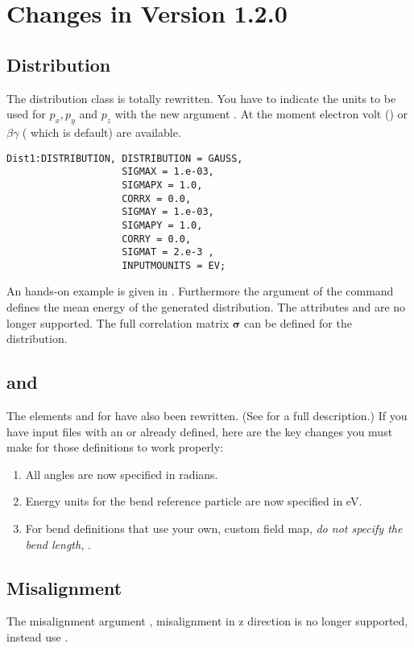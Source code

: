 \section{Changes in \opal Version 1.2.0}
\subsection{Distribution}
The distribution class is totally rewritten. You have to indicate the units to be used for $p_x,p_y$ and $p_z$ with the
new argument . At the moment electron volt () or $\beta\gamma$ ( which is default) are available.
\begin{Verbatim}[label={My orange command sample output}]
Dist1:DISTRIBUTION, DISTRIBUTION = GAUSS,
                    SIGMAX = 1.e-03,
                    SIGMAPX = 1.0,
                    CORRX = 0.0,
                    SIGMAY = 1.e-03,
                    SIGMAPY = 1.0,
                    CORRY = 0.0,
                    SIGMAT = 2.e-3 ,
                    INPUTMOUNITS = EV;
\end{Verbatim}
An hands-on example is given in . Furthermore the  argument of the  command defines the mean energy of the generated distribution. The attributes  and  are no longer supported. The full
correlation matrix $\mathbf\sigma$ can be defined for the  distribution.

\subsection{ and }
The elements  and  for \opalt have also been rewritten. (See  for a
full description.) If you have input files with an  or  already defined, here are the key
changes you must make for those definitions to work properly:

\begin{enumerate}
\item All angles are now specified in radians.
\item Energy units for the bend reference particle are now specified in eV.
\item For bend definitions that use your own, custom field map, \emph{do not specify the bend length, }.
\end{enumerate}

\subsection{Misalignment}
The misalignment argument , misalignment in z direction is no longer supported, instead use .


